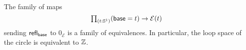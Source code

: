 \begin{comment}
\begin{proof}
We show that the total space satisfies singleton induction (i.e., we apply \cref{thm:contractible}). Let $P$ be a family over the total space of the fundamental cover, and let $p_0:P(\base,0_{\mathcal{E}})$. Our goal is to construct a term of type
\begin{equation*}
\prd{t:\sphere{1}}{x:\mathcal{E}(t)} P(t,x).
\end{equation*}
We do this by induction. For the base case we must construct a term of type
\begin{equation*}
\prd{k:\Z}P(\base,k_{\mathcal{E}}).
\end{equation*}
Since we have the identifications $s_k: (\base,k_{\mathcal{E}})=(\base,\mathsf{succ}(k)_{\mathcal{E}})$, we have the equivalences
\begin{equation*}
\mathsf{tr}_P(s_k) : \eqv{P(\base,k_{\mathcal{E}})}{P(\base,\mathsf{succ}(k)_{\mathcal{E}})}
\end{equation*}
for each $k:\Z$. Thus we obtain a dependent function $f:\prd{x:\mathcal{E}(\base)}P(\base,x)$ satisfying $f(0_{\mathcal{E}})=p_0$ and $f(\mathsf{succ}(k)_{\mathcal{E}})=\mathsf{tr}_P(s_k,f(k_{\mathcal{E}}))$, for each $k:\Z$. 

For the loop case we must show that
\begin{equation*}
\mathsf{tr}_Q(\lloop,f)=f,
\end{equation*}
where $Q$ is the family over $\sphere{1}$ given by $Q(t)\defeq \prd{x:\mathcal{E}(t)} P(t,x)$. By function extensionality it suffices to construct a homotopy, and the transport along $\lloop$ in $Q$ computes as
\begin{equation*}
\mathsf{tr}_Q(\lloop,f)(k_{\mathcal{E}})= \mathsf{tr}_P(s_k,f(\mathsf{succ}^{-1}(k)_{\mathcal{E}})). 
\end{equation*}
Therefore the following computation completes the proof:
\begin{align*}
\mathsf{tr}_Q(\lloop,f)(k_{\mathcal{E}})
& = \mathsf{tr}_P(s_k,f(\mathsf{succ}^{-1}(k)_{\mathcal{E}})) \\
& = f(\mathsf{succ}(\mathsf{succ}^{-1}(k))_{\mathcal{E}}) \\
& = f(k_{\mathcal{E}}).\qedhere
\end{align*}
\end{proof}
\end{comment}

\begin{cor}
  The family of maps
  \begin{equation*}
    \prd{t:\sphere{1}} (\base=t)\to \mathcal{E}(t)
  \end{equation*}
  sending $\mathsf{refl}_{\mathsf{base}}$ to $0_{\mathcal{E}}$ is a family of equivalences. In particular, the loop space of the circle is equivalent to $\mathbb{Z}$.
\end{cor}

